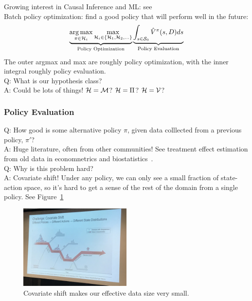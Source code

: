 Growing interest in Causal Inference and ML: see~\citet{pearl2018book} \\

Batch policy optimization: find a good policy that will perform well in the future:
\[
\underbrace{\operatorname*{arg\,max}_{\pi \in \mathcal{H}_i} \max_{\mathcal{H}_i \in \{\mathcal{H}_1, \mathcal{H}_2, \ldots\}}}_{\text{Policy Optimization}} \underbrace{\int_{s \in \mathcal{S}_0} \hat{V}^{\pi}(s, D) ds}_{\text{Policy Evaluation}}
\]
The outer argmax and max are roughly policy optimization, with the inner integral roughly policy evaluation. \\

Q: What is our hypothesis class? \\

A: Could be lots of things! $\mathcal{H} = \mathcal{M}$? $\mathcal{H} = \Pi$? 
$\mathcal{H} = \mathcal{V}$?

\subsubsection{Policy Evaluation}

Q: How good is some alternative policy $\pi$, given data colllected from a previous policy, $\pi'$? \\

A: Huge literature, often from other communities! See treatment effect estimation from old data in economnetrics and biostatistics~\cite{rubin1997estimating}. \\

Q: Why is this problem hard? \\

A: Covariate shift! Under any policy, we can only see a small fraction of state-action space, so it's hard to get a sense of the rest of the domain from a single policy. See Figure~\ref{fig:cf} \\

\begin{figure}[h!]
    \centering
    \includegraphics[width=0.5\textwidth]{images/cf.JPG}
    \caption{Covariate shift makes our effective data size very small.}
    \label{fig:cf}
\end{figure}

